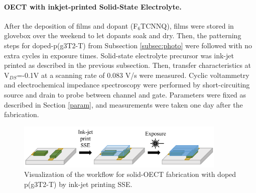 \paragraph{OECT with inkjet-printed Solid-State Electrolyte.}After the deposition of films and dopant (F$_{6}$TCNNQ), films were stored in glovebox over the weekend to let dopants soak and dry. Then, the patterning steps for doped-p(g3T2-T) from Subsection \ref{subsec:photo} were followed with no extra cycles in exposure times. Solid-state electrolyte precursor was ink-jet printed as described in the previous subsection. Then, transfer characteristics at V$_{DS}$=-0.1V at a scanning rate of 0.083 V/s were measured. Cyclic voltammetry and electrochemical impedance spectroscopy were performed by short-circuiting source and drain to probe between channel and gate. Parameters were fixed as described in Section \ref{param}, and measurements were taken one day after the fabrication.

\begin{figure}[!ht]
	\centering
	\includegraphics[width=10cm]{Images/pdf/doped-sse.pdf}
	\caption[Solid-OECT fabrication with doped p(g3T2-T)]{Visualization of the workflow for solid-OECT fabrication with doped p(g3T2-T) by ink-jet printing SSE.}
	\label{fig:dopedsse}
\end{figure}

